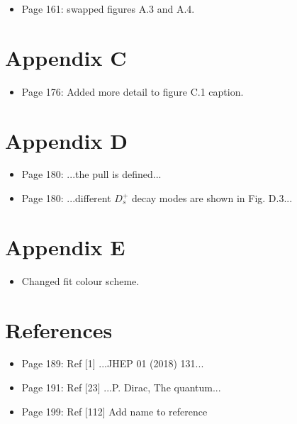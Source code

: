 \documentclass[12pt]{article}
\begin{document}
\begin{itemize}
\item Page 161: swapped figures A.3 and A.4.

\end{itemize}
\section{Appendix C}

\begin{itemize}
\item Page 176: Added more detail to figure C.1 caption.



\end{itemize}
\section{Appendix D}

\begin{itemize}
\item Page 180: ...the {\color{red}pull} is defined...  
\item Page 180: ...different $D_s^+$ decay modes are shown in {\color{red}Fig. D.3}...


\end{itemize}
\section{Appendix E}

\begin{itemize}
\item Changed fit colour scheme.

\end{itemize}
\section{References}


\begin{itemize}
\item Page 189: Ref [1] ...JHEP 01 (2018) {\color{red}131}...
\item Page 191: Ref [23] ...{\color{red}P. Dirac}, The quantum...
\item Page 199: Ref [112]  Add name to reference




\end{itemize}
\end{document}
